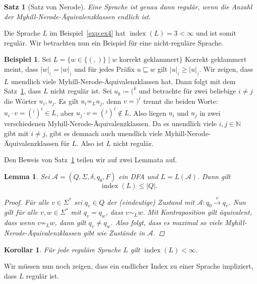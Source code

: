 \documentclass[11pt, a4paper]{article}
\theoremstyle{definition}
\newtheorem{example}[definition]{Beispiel}
\theoremstyle{plain}
\newtheorem{theorem}[definition]{Satz}
\newtheorem{lemma}[definition]{Lemma}
\newtheorem{corollary}[definition]{Korollar}
\numberwithin{equation}{section}
\newcommand{\reaches}[1]{\overset{#1}{\rightarrow}}
\DeclareMathOperator{\ind}{index}
\begin{document}
\begin{theorem}[Satz von Nerode]\label{thm:nerode}
	Eine Sprache ist genau dann regulär, wenn die Anzahl der Myhill-Nerode-Äquivalenzklassen endlich ist.
\end{theorem}
Die Sprache $L$ im Beispiel~\ref{exp:ex4} hat $\ind(L) = 3 < \infty$ und ist somit regulär. Wir betrachten nun ein Beispiel für eine nicht-reguläre Sprache.
\begin{example}
	Sei $L = \{w \in \{(, )\} \mid w \text{ korrekt geklammert}\}$ Korrekt geklammert meint, dass $|w|_( = |w|_)$ und für jedes Präfix $u \sqsubseteq w$ gilt $|u|_( \geq |u|_)$. Wir zeigen, dass $L$ unendlich viele Myhill-Nerode-Äquivalenzklassen hat. Dann folgt mit dem Satz~\ref{thm:nerode}, dass $L$ nicht regulär ist.
	Sei $u_k \coloneqq (^k$ und betrachte für zwei beliebige $i \neq j$ die Wörter $u_i, u_j$. Es gilt $u_i \not\sim_L u_j$, denn $v = )^i$ trennt die beiden Worte: $u_i \cdot v = (^i)^i \in L$, aber $u_j \cdot v = (^j)^i \notin L$. Also liegen $u_i$ und $u_j$ in zwei verschiedenen Myhill-Nerode-Äquivalenzklassen. Da es unendlich viele $i, j \in \mathbb{N}$ gibt mit $i \neq j$, gibt es demnach auch unendlich viele Myhill-Nerode-Äquivalenzklassen für $L$. Also ist $L$ nicht regulär.
\end{example}
Den Beweis von Satz~\ref{thm:nerode} teilen wir auf zwei Lemmata auf.
\begin{lemma}
	Sei $\mathcal{A} = (Q, \Sigma, \delta, q_0, F)$ ein DFA und $L = L(\mathcal{A})$. Dann gilt
	$$
		\ind(L) \leq |Q|.
	$$
	\begin{proof}
		Für alle $v \in \Sigma^\ast$ sei $q_v \in Q$ der (eindeutige) Zustand mit $\mathcal{A}: q_0 \reaches{v} q_v$. Nun gilt für alle $v, w \in \Sigma^\ast$ mit $q_v = q_w$, dass $v \sim_L w$. Mit Kontraposition gilt äquivalent, dass wenn $v \not\sim_L w$, dann gilt $q_v \neq q_w$. Also folgt, dass es maximal so viele Myhill-Nerode-Äquivalenzklassen gibt wie Zustände in $\mathcal{A}$.
	\end{proof}
\end{lemma}
\begin{corollary}\label{cor:reg2mnf}
	Für jede reguläre Sprache $L$ gilt $\ind(L) < \infty$.
\end{corollary}
Wir müssen nun noch zeigen, dass ein endlicher Index zu einer Sprache impliziert, dass $L$ regulär ist.
\end{document}
